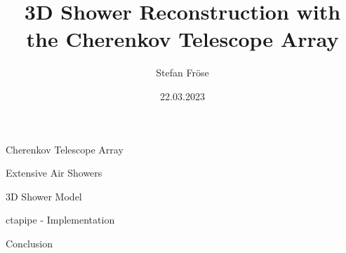 \documentclass[aspectratio=1610, 9pt]{beamer}
\title{3D Shower Reconstruction with the Cherenkov Telescope Array}
\author[S.~Fröse]{Stefan Fröse}
\institute[WG Elsässer]{WG Elsässer \\  Faculty of Physics}
\date{22.03.2023}
\begin{document}
\maketitle

\begin{frame}
  \begin{center}
    \fontsize{40}{48} \selectfont\textcolor{tugreen}{Cherenkov Telescope Array}
  \end{center}
\end{frame}

\begin{frame}
  \begin{center}
    \fontsize{40}{48} \selectfont\textcolor{tugreen}{Extensive Air Showers}
  \end{center}
\end{frame}

\begin{frame}
    \centering
\end{frame}

\begin{frame}
  \begin{center}
    \fontsize{40}{48} \selectfont\textcolor{tugreen}{3D Shower Model}
  \end{center}
\end{frame}

\begin{frame}
  \begin{center}
      \fontsize{40}{48} \selectfont\textcolor{tugreen}{ctapipe - Implementation}
  \end{center}
\end{frame}

\begin{frame}
  \begin{center}
    \fontsize{40}{48} \selectfont\textcolor{tugreen}{Conclusion}
  \end{center}
\end{frame}
\end{document}
